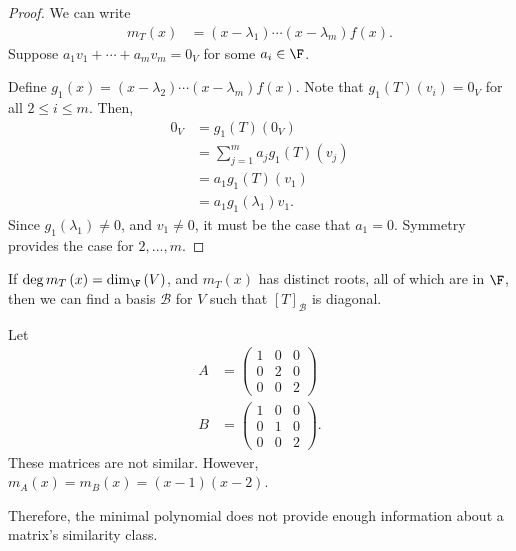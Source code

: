 \documentclass[10pt]{mypackage}
\begin{document}
\begin{proof}
  We can write
  \begin{align*}
    m_T(x) &= \left(x-\lambda_1\right)\cdots\left(x-\lambda_m\right)f(x).
  \end{align*}
  Suppose $a_1v_1 + \cdots + a_mv_m = 0_V$ for some $a_i\in \F$.\newline

  Define $g_1(x) = \left(x-\lambda_2\right)\cdots\left(x-\lambda_m\right)f(x)$. Note that $g_1(T)(v_i) = 0_V$ for all $2\leq i \leq m$. Then,
  \begin{align*}
    0_V &= g_1(T)\left(0_V\right)\\
        &= \sum_{j=1}^{m}a_jg_1(T)\left(v_j\right)\\
        &= a_1g_1(T)\left(v_1\right)\\
        &= a_1g_1\left(\lambda_1\right)v_1.
  \end{align*}
  Since $g_1\left(\lambda_1\right)\neq 0$, and $v_1\neq 0$, it must be the case that $a_1 = 0$. Symmetry provides the case for $2,\dots,m$.
\end{proof}
\begin{corollary}
  If $\deg m_{T}\left(x\right) = \dim_{\F}\left(V\right)$, and $m_{T}\left(x\right)$ has distinct roots, all of which are in $\F$, then we can find a basis $\mathcal{B}$ for $V$ such that $\left[T\right]_{\mathcal{B}}$ is diagonal.
\end{corollary}
\begin{example}
  Let
  \begin{align*}
    A &= \begin{pmatrix}1 & 0 & 0 \\ 0 & 2 & 0 \\ 0 & 0 & 2\end{pmatrix}\\
    B &= \begin{pmatrix}1 & 0 & 0 \\ 0 & 1 & 0 \\ 0 & 0 & 2\end{pmatrix}.
  \end{align*}
  These matrices are not similar. However, $m_{A}(x) = m_{B}\left(x\right) = \left(x-1\right)\left(x-2\right)$.\newline

  Therefore, the minimal polynomial does not provide enough information about a matrix's similarity class.
\end{example}
\end{document}
